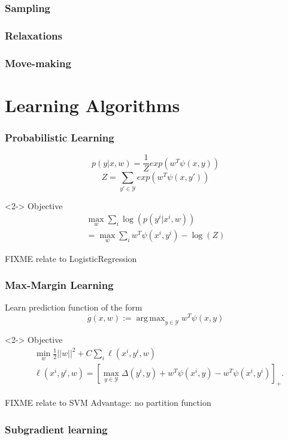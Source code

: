 \documentclass[final,ignorenonframetext,compress]{beamer}
\DeclareMathOperator*{\argmax}{arg\,max}
\newcommand{\hoch}[1]{^{#1}}
\begin{document}
\begin{frame}
    \frametitle{Sampling}
\end{frame}

\begin{frame}
    \frametitle{Relaxations}
\end{frame}

\begin{frame}
    \frametitle{Move-making}
\end{frame}

\section{Learning Algorithms}

\begin{frame}
    \frametitle{Probabilistic Learning}
    \[ p(y|x, w) = \frac{1}{Z} exp(w^T \psi(x, y))\]
    \[Z = \sum_{y' \in \mathcal{Y}} exp(w^T \psi(x, y')) \]
    \begin{visibleenv}<2->
    Objective
    \begin{align*}
        \max_w \sum_i \log(p(y\hoch{i} | x\hoch{i}, w))\\
        = \max_w \sum_i w^T \psi(x\hoch{i}, y\hoch{i}) - \log(Z)
    \end{align*}
    \end{visibleenv}
    FIXME relate to LogisticRegression
\end{frame}


\begin{frame}
    \frametitle{Max-Margin Learning}
    Learn prediction function of the form
    \[g(x, w) := \argmax_{y \in \mathcal{Y}}  w^T \psi(x, y) \]
    \begin{visibleenv}<2->
        Objective
        \begin{align*}
            &\min_w \frac{1}{2} ||w||^2 + C \sum_i  \ell(x\hoch{i}, y\hoch{i}, w)\\
            &\ell(x\hoch{i}, y\hoch{i}, w) = [\max_{y \in \mathcal{Y}} \Delta(y\hoch{i}, y) + w^T \psi(x\hoch{i}, y) - w^T \psi(x\hoch{i}, y\hoch{i})]_+.
        \end{align*}
    \cite{joachims2009cutting}
    \end{visibleenv}
    FIXME relate to SVM
    Advantage: no partition function
\end{frame}


\begin{frame}
    \frametitle{Subgradient learning}
\end{frame}
\end{document}
